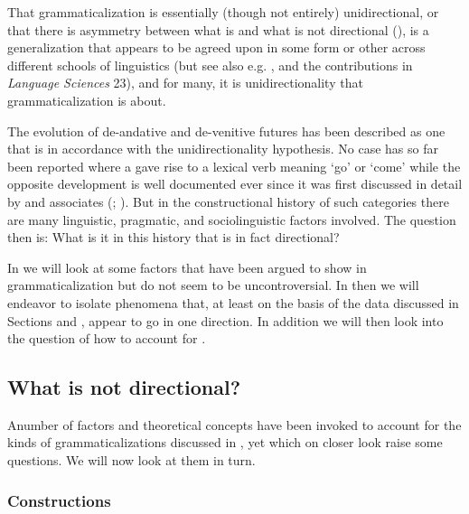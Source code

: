 \documentclass[output=paper]{langsci/langscibook}
\begin{document}
That grammaticalization is essentially (though not entirely) unidirectional, or that there is asymmetry between what is and what is not directional (\citealt{BörjarsVincent2011}), is a generalization that appears to be agreed upon in some form or other across different schools of linguistics (but see also e.g. \citealt{Newmeyer1998,Norde2009}, and the contributions in \textit{Language Sciences} 23), and for many, it is unidirectionality that grammaticalization is about.



  The evolution of de-andative and de-venitive futures has been described as one that is in accordance with the unidirectionality hypothesis. No case has so far been reported where a  gave rise to a lexical verb meaning `go' or `come' while the opposite development is well documented ever since it was first discussed in detail by \citeauthor{Bybee2011} and associates (\citealt{BybeeEtAl1991}; \citeyear{BybeeEtAl1994}). But in the constructional history of such categories there are many linguistic, pragmatic, and sociolinguistic factors involved. The question then is: What is it in this history that is in fact directional?



  In  we will look at some factors that have been argued to show  in grammaticalization but do not seem to be uncontroversial. In  then we will endeavor to isolate phenomena that, at least on the basis of the data discussed in Sections  and , appear to go in one direction. In addition we will then look into the question of how to account for .



\subsection{What is not directional?}\label{sec:heine:4.1}
A\largerpage[2] number of factors and theoretical concepts have been invoked to account for the kinds of grammaticalizations discussed in   , yet which on closer look raise some questions. We will now look at them in turn.



\subsubsection{Constructions}\label{sec:heine:4.1.1}
\end{document}
